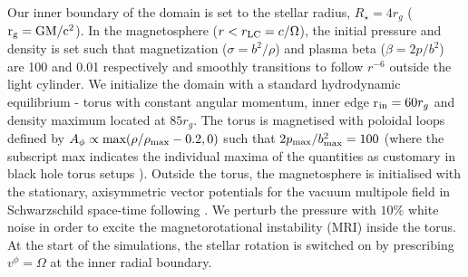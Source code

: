 \documentclass[fleqn,usenatbib]{mnras}
\newcommand{\rstar}{\ensuremath{R_{\star}}}
\begin{document}
Our inner boundary of the domain is set to the stellar radius, $\rstar = 4r_g$ (${\rm r_g = GM/c^2}$). In the magnetosphere ($r<r_{\rm LC} = c/\Omega$), the initial pressure and density is set such that magnetization ($\sigma = b^2/\rho$) and plasma beta ($\beta = 2p/b^2$) are 100 and 0.01 respectively and smoothly transitions to follow $r^{-6}$ outside the light cylinder. We initialize the domain with a  standard hydrodynamic equilibrium  \cite{Fishbone1976}- torus with constant angular momentum, inner edge r$_{\rm in} = 60r_g$ and density maximum located at $85r_g$. The torus is magnetised with poloidal loops defined by $A_{\phi} \propto {\rm max(\rho/\rho_{\rm max} - 0.2,0)}$ such that $2p_{\rm max}/b^2_{\rm max}=100$ (where the subscript max indicates the individual maxima of the quantities as customary in black hole torus setups \cite[e.g.][]{Porth2019}). Outside the torus, the magnetosphere is initialised with the stationary, axisymmetric vector potentials for the vacuum multipole field in Schwarzschild space-time following \cite{Wasserman1983}. We perturb the pressure with $10\%$ white noise in order to excite the magnetorotational instability (MRI) inside the torus.  At the start of the simulations, the stellar rotation is switched on by prescribing $v^\phi=\Omega$ at the inner radial boundary.  
\end{document}
